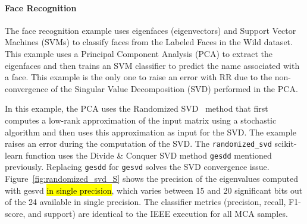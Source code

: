 \documentclass[10pt,journal,compsoc]{IEEEtran}
\DeclareRobustCommand{\add}[1]{{\sethlcolor{lightgreen}\hl{#1}}}
\begin{document}






\paragraph{Face Recognition}

The face recognition example uses eigenfaces (eigenvectors) and Support Vector
Machines (SVMs) to classify faces from the Labeled Faces in the Wild dataset.
This example uses a Principal Component Analysis (PCA) to extract the eigenfaces
and then trains an SVM classifier to predict the name associated with a face.
This example is the only one to raise an error with RR due to the
non-convergence of the Singular Value Decomposition (SVD) performed in the PCA.

In this example, the PCA uses the Randomized SVD~\cite{halko2011finding} method
that first computes a low-rank approximation of the input matrix using a
stochastic algorithm and then uses this approximation as input for the SVD. The
example raises an error during the computation of the SVD. The
\texttt{randomized\_svd} scikit-learn function uses the Divide \& Conquer SVD
method \texttt{gesdd} mentioned previously. Replacing \texttt{gesdd} for
\texttt{gesvd} solves the SVD convergence issue.
Figure~\ref{fig:randomized_svd_S} shows the precision of the eigenvalues
computed with gesvd \add{in single precision}, which varies between 15 and 20 significant bits out of the
24 available in single precision. The classifier metrics (precision, recall,
F1-score, and support) are identical to the IEEE execution for all MCA samples.
\end{document}
